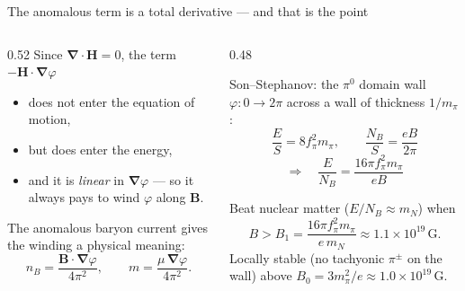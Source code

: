 \documentclass[aspectratio=169,10pt]{beamer}
\newcommand{\B}{\bm{B}}
\newcommand{\Hb}{\bm{H}}
\newcommand{\gr}{\bm{\nabla}}
\newcommand{\fpi}{f_\pi}
\newcommand{\mpi}{m_\pi}
\begin{document}
\begin{frame}{The anomalous term is a total derivative --- and that is the point}
\begin{columns}[T,onlytextwidth]
\begin{column}{0.52\textwidth}
Since $\gr\cdot\Hb=0$, the term $-\Hb\cdot\gr\varphi$
\begin{itemize}
  \item does \alert{not} enter the equation of motion,
  \item but \alert{does} enter the energy,
  \item and it is \emph{linear} in $\gr\varphi$ --- so it always pays to wind
        $\varphi$ along $\B$.
\end{itemize}
\vspace{2mm}
The anomalous baryon current gives the winding a physical meaning:
\[
  n_B=\frac{\B\cdot\gr\varphi}{4\pi^2},\qquad
  m=\frac{\mu\,\gr\varphi}{4\pi^2}.
\]
\end{column}
\begin{column}{0.48\textwidth}
\begin{block}{Son--Stephanov: the $\pi^0$ domain wall}
$\varphi:0\to2\pi$ across a wall of thickness $1/\mpi$:
\[
 \frac{E}{S}=8\fpi^2\mpi,\qquad \frac{N_B}{S}=\frac{eB}{2\pi}
\]
\[
 \Rightarrow\quad \frac{E}{N_B}=\frac{16\pi \fpi^2\mpi}{eB}
\]
\end{block}
\vspace{1mm}
{\small Beat nuclear matter ($E/N_B\approx m_N$) when
\[
 B>B_1=\frac{16\pi \fpi^2\mpi}{e\,m_N}\approx1.1\times10^{19}\,\mathrm{G}.
\]
Locally stable (no tachyonic $\pi^\pm$ on the wall) above
$B_0=3\mpi^2/e\approx1.0\times10^{19}\,$G.}
\end{column}
\end{columns}
\end{frame}
\end{document}

